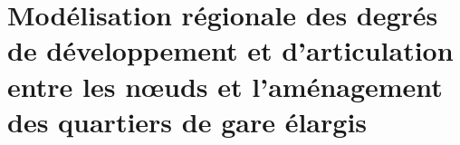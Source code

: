
\chapter
{Modélisation régionale des degrés de développement et d'articulation entre les nœuds et l'aménagement des quartiers de gare élargis
    \label{chap6:titre}
    }
    \begin{refsegment}



\end{refsegment}
